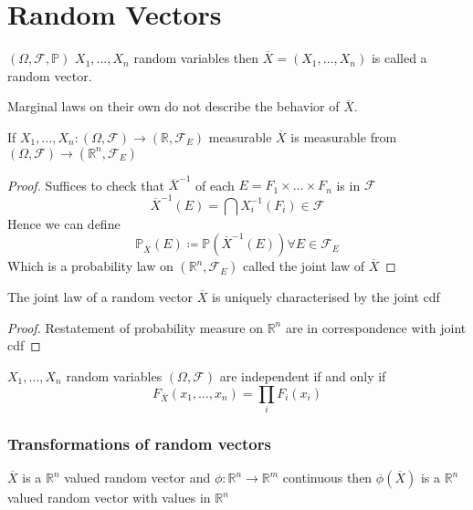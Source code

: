 \documentclass[../main.tex]{subfiles}
\begin{document}
\section{Random Vectors}
\begin{defn}
	$ ( \Omega, \mathcal{F}, \mathbb{P}) $ $X_1,\ldots, X_n$ random variables then $\overline{X}= ( X_1,\ldots, X_n) $ is called a random vector.
\end{defn}
\begin{rmq}
Marginal laws on their own do not describe the behavior of $\overline{X}$.\\
\end{rmq}
\begin{lemma}
If $X_1,\ldots, X_n: ( \Omega, \mathcal{F}) \to ( \mathbb{R}, \mathcal{F}_E) $ measurable $ \overline{X}$ is measurable from $ ( \Omega, \mathcal{F}) \to ( \mathbb{R}^n, \mathcal{F}_E) $ 
\end{lemma}
\begin{proof}
Suffices to check that $\overline{X}^{-1}$ of each $E= F_1\times \ldots \times F_n$ is in $ \mathcal{F}$ 
\[ 
\overline{X}^{-1}( E) = \bigcap X_i^{-1}( F_i) \in \mathcal{F}
\]
Hence we can define 
\[ 
\mathbb{P}_{\overline{X}} ( E) \coloneqq \mathbb{P}( \overline{X}^{-1}( E) ) \forall E \in \mathcal{F}_E
\]
Which is a probability law on $ ( \mathbb{R}^n, \mathcal{F}_E) $ called the joint law of $ \overline{X}$ 
\end{proof}
\begin{propo}
The joint law of a random vector $\overline{X}$ is uniquely characterised by the joint cdf
\end{propo}
\begin{proof}
Restatement of probability measure on $ \mathbb{R}^n$ are in correspondence with joint cdf
\end{proof}
\begin{lemma}
$X_1, \ldots, X_n$ random variables $ ( \Omega, \mathcal{F}) $ are independent if and only if
\[ 
F_{\overline{X}} ( x_1, \ldots, x_n) = \prod_i F_i( x_i) 
\]

\end{lemma}
\subsubsection*{Transformations of random vectors}
\begin{propo}
$ \overline{X}$ is a $ \mathbb{R}^n$ 	valued random vector and $\phi: \mathbb{R}^n\to \mathbb{R}^m	$ continuous then $\phi( \overline{X}) $ is a $ \mathbb{R}^n$ valued random vector with values in $ \mathbb{R}^n$ 
\end{propo}
\end{document}
